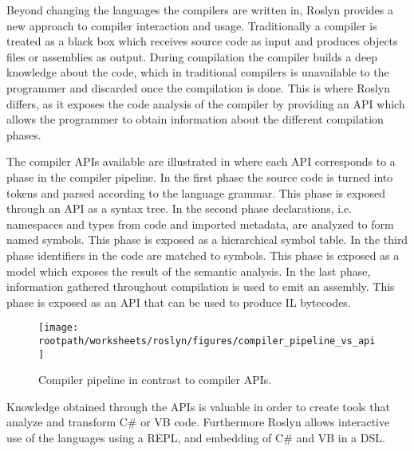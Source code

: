 Beyond changing the languages the compilers are written in, Roslyn provides a new approach to compiler interaction and usage. Traditionally a compiler is treated as a black box which receives source code as input and produces objects files or assemblies as output\cite[p. 3]{ng2012roslyn}. During compilation the compiler builds a deep knowledge about the code, which in traditional compilers is unavailable to the programmer and discarded once the compilation is done. This is where Roslyn differs, as it exposes the code analysis of the compiler by providing an \ac{API} which allows the programmer to obtain information about the different compilation phases\cite[p. 3]{ng2012roslyn}. 

The compiler \acp{API} available are illustrated in  where each \ac{API} corresponds to a phase in the compiler pipeline. In the first phase the source code is turned into tokens and parsed according to the language grammar. This phase is exposed through an \ac{API} as a syntax tree. In the second phase declarations, i.e. namespaces and types from code and imported metadata, are analyzed to form named symbols. This phase is exposed as a hierarchical symbol table. In the third phase identifiers in the code are matched to symbols. This phase is exposed as a model which exposes the result of the semantic analysis. In the last phase, information gathered throughout compilation is used to emit an assembly. This phase is exposed as an \ac{API} that can be used to produce IL bytecodes\cite[p. 3-4]{ng2012roslyn}.

\begin{figure}[htbp]
\centering
 \texttt{[image: \\rootpath/worksheets/roslyn/figures/compiler\_pipeline\_vs\_api]} 
 \caption{Compiler pipeline in contrast to compiler \acp{API}\cite[p. 4]{ng2012roslyn}.}
\label{fig:api_vs_compiler_pipeline}
\end{figure}

Knowledge obtained through the \acp{API} is valuable in order to create tools that analyze and transform C\# or \ac{VB} code. Furthermore Roslyn allows interactive use of the languages using a \ac{REPL}\cite{cSharp2012interactive}, and embedding of  C\# and \ac{VB} in a \ac{DSL}\cite[p. 3]{ng2012roslyn}.


